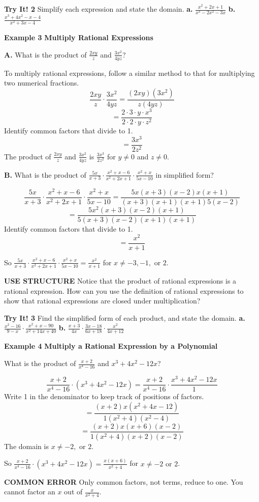 \documentclass{article}
\newenvironment{example}[1]{\textbf{Example #1}}{\vspace{1em}}
\newenvironment{tryit}[1]{\textbf{Try It! #1}}{\vspace{1em}}
\newcommand{\answer}[1]{}
\begin{document}
\begin{tryit}{2}
Simplify each expression and state the domain.
\textbf{a.} $\frac{x^2 + 2x + 1}{x^3 - 2x^2 - 3x}$ \qquad
\textbf{b.} $\frac{x^3 + 4x^2 - x - 4}{x^2 + 3x - 4}$
\answer{}
\end{tryit}

\begin{example}{3}
\textbf{Multiply Rational Expressions}

\textbf{A.} What is the product of $\frac{2xy}{z}$ and $\frac{3x^2}{4yz}$?

To multiply rational expressions, follow a similar method to that for multiplying two numerical fractions.
$$ \frac{2xy}{z} \cdot \frac{3x^2}{4yz} = \frac{(2xy)(3x^2)}{z(4yz)} $$
$$ = \frac{2 \cdot 3 \cdot y \cdot x^3}{2 \cdot 2 \cdot y \cdot z^2} $$
Identify common factors that divide to 1.
$$ = \frac{3x^3}{2z^2} $$
The product of $\frac{2xy}{z}$ and $\frac{3x^2}{4yz}$ is $\frac{3x^3}{2z^2}$ for $y \neq 0$ and $z \neq 0$.

\textbf{B.} What is the product of $\frac{5x}{x+3} \cdot \frac{x^2+x-6}{x^2+2x+1} \cdot \frac{x^2+x}{5x-10}$ in simplified form?

$$ \frac{5x}{x+3} \cdot \frac{x^2+x-6}{x^2+2x+1} \cdot \frac{x^2+x}{5x-10} = \frac{5x(x+3)(x-2)x(x+1)}{(x+3)(x+1)(x+1)5(x-2)} $$
$$ = \frac{5x^2(x+3)(x-2)(x+1)}{5(x+3)(x-2)(x+1)(x+1)} $$
Identify common factors that divide to 1.
$$ = \frac{x^2}{x+1} $$

So $\frac{5x}{x+3} \cdot \frac{x^2+x-6}{x^2+2x+1} \cdot \frac{x^2+x}{5x-10} = \frac{x^2}{x+1}$ for $x \neq -3, -1, \text{ or } 2$.

\textbf{USE STRUCTURE}
Notice that the product of rational expressions is a rational expression. How can you use the definition of rational expressions to show that rational expressions are closed under multiplication?
\end{example}

\begin{tryit}{3}
Find the simplified form of each product, and state the domain.
\textbf{a.} $\frac{x^2-16}{9-x} \cdot \frac{x^2+x-90}{x^2+14x+40}$ \qquad
\textbf{b.} $\frac{x+3}{4x} \cdot \frac{3x-18}{6x+18} \cdot \frac{x^2}{4x+12}$
\answer{}
\end{tryit}

\begin{example}{4}
\textbf{Multiply a Rational Expression by a Polynomial}

What is the product of $\frac{x+2}{x^4-16}$ and $x^3+4x^2-12x$?

$$ \frac{x+2}{x^4-16} \cdot (x^3 + 4x^2 - 12x) = \frac{x+2}{x^4-16} \cdot \frac{x^3 + 4x^2 - 12x}{1} $$
Write 1 in the denominator to keep track of positions of factors.
$$ = \frac{(x+2)x(x^2+4x-12)}{1(x^2+4)(x^2-4)} $$
$$ = \frac{(x+2)x(x+6)(x-2)}{1(x^2+4)(x+2)(x-2)} $$
The domain is $x \neq -2, \text{ or } 2$.

So $\frac{x+2}{x^4-16} \cdot (x^3 + 4x^2 - 12x) = \frac{x(x+6)}{x^2+4}$ for $x \neq -2 \text{ or } 2$.

\textbf{COMMON ERROR}
Only common factors, not terms, reduce to one. You cannot factor an $x$ out of $\frac{x}{x^2+4}$.
\end{example}
\end{document}

